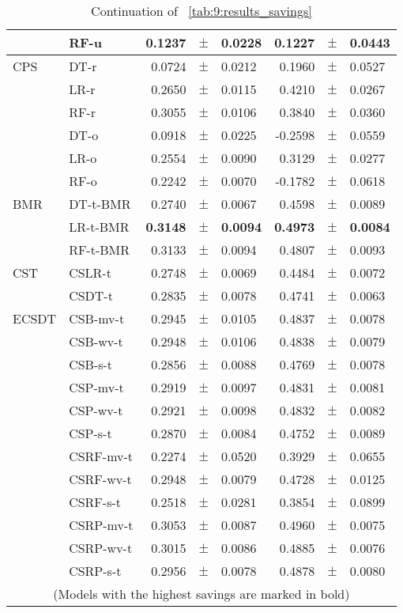 {\begin{table}[!t]
\begin{tabular}{l l r@{\hskip 0in}c@{\hskip 0in}l r@{\hskip 0in}c@{\hskip 0in}l  }
&RF-u & 0.1237 &$\pm$& 0.0228 & 0.1227 &$\pm$& 0.0443\\ 
\hline 
CPS&DT-r & 0.0724 &$\pm$&0.0212 & 0.1960 &$\pm$& 0.0527\\ 
&LR-r &  0.2650 &$\pm$& 0.0115 & 0.4210 &$\pm$& 0.0267\\ 
&RF-r & 0.3055 &$\pm$& 0.0106 & 0.3840 &$\pm$& 0.0360\\ 
&DT-o &  0.0918 &$\pm$&0.0225 & -0.2598 &$\pm$& 0.0559\\ 
&LR-o &  0.2554 &$\pm$&0.0090 & 0.3129 &$\pm$& 0.0277\\ 
&RF-o &  0.2242 &$\pm$&0.0070 & -0.1782 &$\pm$& 0.0618\\ 
\hline 
BMR&DT-t-BMR & 0.2740 &$\pm$& 0.0067 & 0.4598 &$\pm$& 0.0089\\ 
&LR-t-BMR & \bf{0.3148} &\bf{$\pm$}& \bf{0.0094} & \bf{0.4973} &\bf{$\pm$}& \bf{0.0084}\\ 
&RF-t-BMR & 0.3133 &$\pm$& 0.0094 & 0.4807 &$\pm$& 0.0093\\ 
\hline 
CST&CSLR-t & 0.2748 &$\pm$&0.0069 & 0.4484 &$\pm$& 0.0072\\ 
&CSDT-t &  0.2835 &$\pm$& 0.0078 & 0.4741 &$\pm$& 0.0063\\ 
\hline 
ECSDT&CSB-mv-t &  0.2945 &$\pm$& 0.0105 & 0.4837 &$\pm$& 0.0078\\ 
&CSB-wv-t & 0.2948 &$\pm$&0.0106 & 0.4838 &$\pm$& 0.0079\\ 
&CSB-s-t &  0.2856 &$\pm$& 0.0088 & 0.4769 &$\pm$& 0.0078\\ 
&CSP-mv-t & 0.2919 &$\pm$& 0.0097 & 0.4831 &$\pm$& 0.0081\\ 
&CSP-wv-t & 0.2921 &$\pm$& 0.0098 & 0.4832 &$\pm$& 0.0082\\ 
&CSP-s-t &  0.2870 &$\pm$& 0.0084 & 0.4752 &$\pm$& 0.0089\\ 
&CSRF-mv-t &  0.2274 &$\pm$& 0.0520 & 0.3929 &$\pm$& 0.0655\\ 
&CSRF-wv-t &  0.2948 &$\pm$& 0.0079 & 0.4728 &$\pm$& 0.0125\\ 
&CSRF-s-t &  0.2518 &$\pm$& 0.0281 & 0.3854 &$\pm$& 0.0899\\ 
&CSRP-mv-t & 0.3053 &$\pm$& 0.0087 & 0.4960 &$\pm$& 0.0075\\ 
&CSRP-wv-t & 0.3015 &$\pm$& 0.0086 & 0.4885 &$\pm$& 0.0076\\ 
&CSRP-s-t & 0.2956 &$\pm$& 0.0078 & 0.4878 &$\pm$& 0.0080\\ 
  \hline
  \multicolumn{8}{c}{(Models with the highest savings are marked in bold)}
  \end{tabular}
    \caption{Continuation of \tablename{~\ref{tab:9:results_savings}}}
    \label{tab:9:results_savings2}
  \end{table}
  
}
